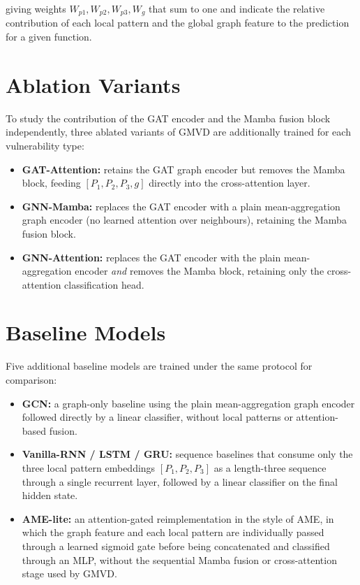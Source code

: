 \documentclass[12pt, a4paper, openright, twoside]{report}
\begin{document}
giving weights $W_{p1}, W_{p2}, W_{p3}, W_g$ that sum to one and indicate the relative contribution of each local pattern and the global graph feature to the prediction for a given function.

\section{Ablation Variants}

To study the contribution of the GAT encoder and the Mamba fusion block independently, three ablated variants of GMVD are additionally trained for each vulnerability type:

\begin{itemize}
    \item \textbf{GAT-Attention:} retains the GAT graph encoder but removes the Mamba block, feeding $[P_1,P_2,P_3,g]$ directly into the cross-attention layer.
    \item \textbf{GNN-Mamba:} replaces the GAT encoder with a plain mean-aggregation graph encoder (no learned attention over neighbours), retaining the Mamba fusion block.
    \item \textbf{GNN-Attention:} replaces the GAT encoder with the plain mean-aggregation encoder \textit{and} removes the Mamba block, retaining only the cross-attention classification head.
\end{itemize}

\section{Baseline Models}

Five additional baseline models are trained under the same protocol for comparison:

\begin{itemize}
    \item \textbf{GCN:} a graph-only baseline using the plain mean-aggregation graph encoder followed directly by a linear classifier, without local patterns or attention-based fusion.
    \item \textbf{Vanilla-RNN / LSTM / GRU:} sequence baselines that consume only the three local pattern embeddings $[P_1,P_2,P_3]$ as a length-three sequence through a single recurrent layer, followed by a linear classifier on the final hidden state.
    \item \textbf{AME-lite:} an attention-gated reimplementation in the style of AME, in which the graph feature and each local pattern are individually passed through a learned sigmoid gate before being concatenated and classified through an MLP, without the sequential Mamba fusion or cross-attention stage used by GMVD.
\end{itemize}
\end{document}
